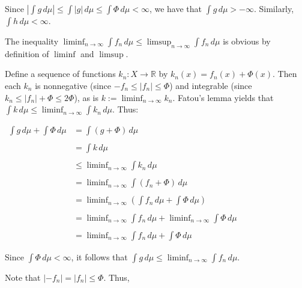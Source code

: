 \documentclass[12pt]{article}
\begin{document}
Since $\displaystyle \left| \int g \, d\mu \right| \le \int |g| \, d\mu \le \int \Phi \, d\mu < \infty$, we have that $\displaystyle \int g \, d\mu > - \infty$.  Similarly, $\displaystyle \int h \, d\mu < \infty$.

The inequality $\displaystyle \liminf_{n \to \infty} \int f_n \, d\mu \le \limsup_{n \to \infty} \int f_n \, d\mu$ is obvious by definition of $\liminf$ and $\limsup$.

Define a sequence of functions $k_n \colon X \to \mathbb{R}$ by $k_n(x)=f_n(x)+\Phi (x)$.  Then each $k_n$ is nonnegative (since $-f_n \le |f_n| \le \Phi$) and integrable (since $k_n \le |f_n|+\Phi \le 2\Phi$), as is $\displaystyle k := \liminf_{n \to \infty} k_n$.  Fatou's lemma yields that $\displaystyle \int k \, d\mu \le \liminf_{n \to \infty} \int k_n \, d\mu$.  Thus:

\begin{center}
$\begin{array}{ll}
\displaystyle \int g \, d\mu + \int \Phi \, d\mu & \displaystyle = \int (g+\Phi) \, d\mu \\
\\
& \displaystyle = \int k \, d\mu \\
\\
& \displaystyle \le \liminf_{n \to \infty} \int k_n \, d\mu \\
\\
& \displaystyle = \liminf_{n \to \infty} \int (f_n+\Phi) \, d\mu \\
\\
& \displaystyle = \liminf_{n \to \infty} \left( \int f_n \, d\mu + \int \Phi \, d\mu \right) \\
\\
& \displaystyle = \liminf_{n \to \infty} \int f_n \, d\mu + \liminf_{n \to \infty} \int \Phi \, d\mu \\
\\
& \displaystyle = \liminf_{n \to \infty} \int f_n \, d\mu + \int \Phi \, d\mu \end{array}$
\end{center}

Since $\displaystyle \int \Phi \, d\mu < \infty$, it follows that $\displaystyle \int g \, d\mu \le \liminf_{n \to \infty} \int f_n \, d\mu$.

Note that $|-f_n|=|f_n| \le \Phi$.  Thus,
\end{document}
